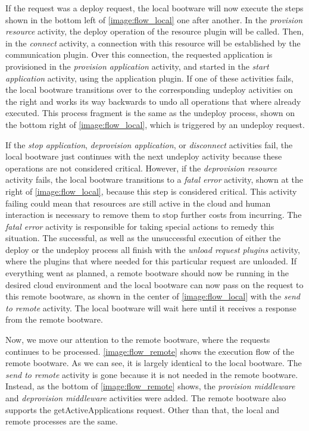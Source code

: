 If the request was a deploy request, the local bootware will now execute the steps shown in the bottom left of \autoref{image:flow_local} one after another.
In the \textit{provision resource} activity, the deploy operation of the resource plugin will be called.
Then, in the \textit{connect} activity, a connection with this resource will be established by the communication plugin.
Over this connection, the requested application is provisioned in the \textit{provision application} activity, and started in the \textit{start application} activity, using the application plugin.
If one of these activities fails, the local bootware transitions over to the corresponding undeploy activities on the right and works its way backwards to undo all operations that where already executed.
This process fragment is the same as the undeploy process, shown on the bottom right of \autoref{image:flow_local}, which is triggered by an undeploy request.

If the \textit{stop application}, \textit{deprovision application}, or \textit{disconnect} activities fail, the local bootware just continues with the next undeploy activity because these operations are not considered critical.
However, if the \textit{deprovision resource} activity fails, the local bootware transitions to a \textit{fatal error} activity, shown at the right of \autoref{image:flow_local}, because this step is considered critical.
This activity failing could mean that resources are still active in the cloud and human interaction is necessary to remove them to stop further costs from incurring.
The \textit{fatal error} activity is responsible for taking special actions to remedy this situation.
The successful, as well as the unsuccessful execution of either the deploy or the undeploy process all finish with the \textit{unload request plugins} activity, where the plugins that where needed for this particular request are unloaded.
If everything went as planned, a remote bootware should now be running in the desired cloud environment and the local bootware can now pass on the request to this remote bootware, as shown in the center of \autoref{image:flow_local} with the \textit{send to remote} activity.
The local bootware will wait here until it receives a response from the remote bootware.

Now, we move our attention to the remote bootware, where the requests continues to be processed.
\autoref{image:flow_remote} shows the execution flow of the remote bootware.
As we can see, it is largely identical to the local bootware.
The \textit{send to remote} activity is gone because it is not needed in the remote bootware.
Instead, as the bottom of \autoref{image:flow_remote} shows, the \textit{provision middleware} and \textit{deprovision middleware} activities were added.
The remote bootware also supports the getActiveApplications request.
Other than that, the local and remote processes are the same.

